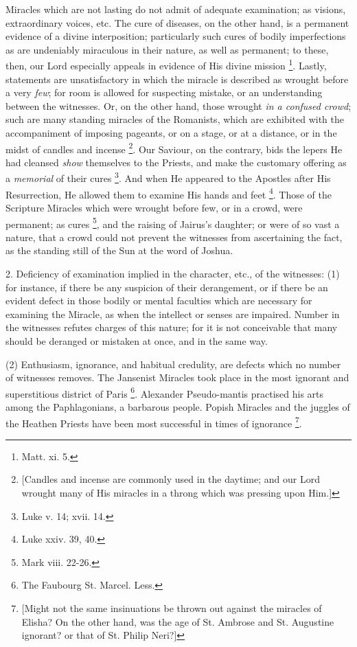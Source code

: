 Miracles which are not lasting do not admit of
adequate examination; as visions, extraordinary voices, etc. The cure
of diseases, on the other hand, is a permanent evidence of a
divine interposition; particularly such cures of bodily imperfections
as are undeniably miraculous in their nature, as well as permanent; to
these, then, our Lord especially appeals in evidence of His divine
mission \footnote{Matt. xi. 5.}. Lastly,
statements are unsatisfactory in which the miracle is described as
wrought before a very \emph{few}; for room is allowed for suspecting
mistake, or an understanding between the witnesses. Or, on the other
hand, those wrought \emph{in a confused crowd}; such are many standing
miracles of the Romanists, which are exhibited with the accompaniment
of imposing pageants, or on a stage, or at a distance, or in the midst
of candles and incense \footnote{[Candles and incense are commonly used in the daytime; and our Lord
wrought many of His miracles in a throng which was pressing upon Him.]}.
Our Saviour, on the contrary, bids the lepers He had cleansed \emph{show}
themselves to the Priests, and make the customary offering as a \emph{memorial}
of their cures \footnote{Luke v. 14; xvii. 14.}. And
when He appeared to the Apostles after His Resurrection, He allowed
them to examine His hands and feet \footnote{Luke xxiv. 39, 40.}. Those of the Scripture Miracles which were wrought before
few, or in a crowd, were permanent; as cures \footnote{Mark viii. 22-26.}, and the raising of Jairus's daughter; or were of so vast a
nature, that a crowd could not prevent the witnesses from
ascertaining the fact, as the standing still of the Sun at the word of
Joshua.

2. Deficiency of examination implied in the
character, etc., of the witnesses: (1) for instance, if there be any
suspicion of their derangement, or if there be an evident defect in
those bodily or mental faculties which are necessary for examining the
Miracle, as when the intellect or senses are impaired. Number in the
witnesses refutes charges of this nature; for it is not conceivable
that many should be deranged or mistaken at once, and in the same way.

(2) Enthusiasm, ignorance, and habitual
credulity, are defects which no number of witnesses removes. The
Jansenist Miracles took place in the most ignorant and superstitious
district of Paris \footnote{The Faubourg St. Marcel. Less.}.
Alexander Pseudo-mantis practised his arts among the Paphlagonians, a
barbarous people. Popish Miracles and the juggles of the Heathen
Priests have been most successful in times of ignorance \footnote{[Might not the same insinuations be thrown out against the miracles of
Elisha? On the other hand, was the age of St. Ambrose and St.
Augustine ignorant? or that of St. Philip Neri?]}.

